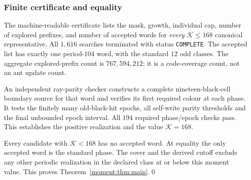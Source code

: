 \subsubsection{Finite certificate and equality}
The machine-readable certificate lists the mask, growth, individual cap,
number of explored prefixes, and number of accepted words for \emph{every}
$\mathcal K\le168$ canonical representative. All $1,616$ searches terminated
with status \texttt{COMPLETE}. The accepted list has exactly one period-$104$ word, with the
standard $12$ odd classes. The aggregate explored-prefix count is
$767,594,212$; it is a code-coverage count, not an ant update count.

An independent ray-parity checker constructs a complete nineteen-black-cell
boundary source for that word and verifies its first required colour at each
phase. It tests the finitely many old-black-hit epochs, all self-write parity
thresholds and the final unbounded epoch interval. All $194$ required
phase/epoch checks pass. This establishes the positive realization and the
value $\mathcal K=168$.

Every candidate with $\mathcal K<168$ has no accepted word. At equality the
only accepted word is the standard phase. The cover and the derived cutoff
exclude any other periodic realization in the declared class at or below this moment value.
This proves Theorem~\ref{moment:thm:main}.\qed

